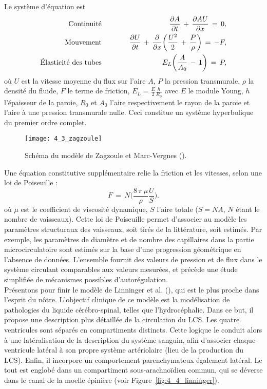 Le système
d'équation est
\begin{eqnarray}
 \mbox{Continuité\hspace{1cm}}&&\frac{\partial A}{\partial t}\,+\,\frac{\partial A U}{\partial x}\,=\,0,\\
\mbox{Mouvement\hspace{1cm}}&&\frac{\partial U}{\partial t}\,+\,\frac{\partial}{\partial x} \biggl(\frac{U^2}{2}\,+\,\frac{P}{\rho}\biggr)\,=\,-F,\\
\mbox{\'Elasticité  des tubes\hspace{1cm}}&&E_L\biggl(\frac{A}{A_0}\,-\,1\biggr)\,=\,P,
\end{eqnarray}
où $U$ est la vitesse moyenne du flux sur l'aire $A$, $P$ la pression transmurale, $\rho$ la densité du fluide, $F$ le terme de friction, $E_L=\frac{E}{2}\frac{h}{R_0}$ avec $E$ le module Young, $h$ l'épaisseur de la paroie, $R_0$ et $A_0$ l'aire respectivement le rayon de la paroie et l'aire à une pression transmurale nulle.
 Ceci constitue un système hyperbolique du premier ordre complet. 
\begin{figure}[!t]
\centering
\texttt{[image: 4\_3\_zagzoule]}
\caption{Schéma du modèle de Zagzoule et Marc-Vergnes (\cite{Zagzoule1986}).}
\label{fig:4_3_zagzoule}	
\end{figure}


Une équation constitutive
supplémentaire relie la friction et les vitesses, selon une loi de Poiseuille :
\begin{equation}
\label{eq:poiseuille}
F\,=\,N\biggl(\frac{8\,\pi\,\mu}{\rho}\frac{U}{S}\biggr).
\end{equation}
où $\mu$ est le coefficient de viscosité dynamique, $S$ l'aire totale ($S = NA$, $N$ étant le nombre de vaisseaux). Cette loi de Poiseuille permet d'associer au modèle les paramètres structuraux des vaisseaux, soit tirés
de la littérature, soit estimés. Par exemple, les paramètres de diamètre et de nombre des capillaires
dans la partie microcirculatoire sont estimés sur la base d'une progression géométrique en l'absence
de données. L'ensemble fournit des valeurs de pression et de flux dans le système circulant
comparables aux valeurs mesurées, et précède une étude simplifiée de mécanismes possibles
d'autorégulation.\\
Présentons pour finir le modèle de Linninger et al. (\cite{Linninger2009}), qui est le plus proche dans l'esprit du
nôtre. L'objectif clinique de ce modèle est la modélisation de pathologies du liquide cérébro-spinal,
telles que l'hydrocéphalie. Dans ce but, il propose une description plus détaillée de la circulation du
LCS. Les quatre ventricules sont séparés en compartiments distincts. Cette logique le conduit alors à
une latéralisation de la description du système sanguin, afin d'associer chaque ventricule latéral à son
propre système artériolaire (lieu de la production du LCS). Enfin, il incorpore un comportement
parenchymateux également latéral. Le tout est englobé dans un compartiment sous-arachnoïdien
commun, qui se déverse dans le canal de la moelle épinière (voir Figure~\ref{fig:4_4_linninger}). 

